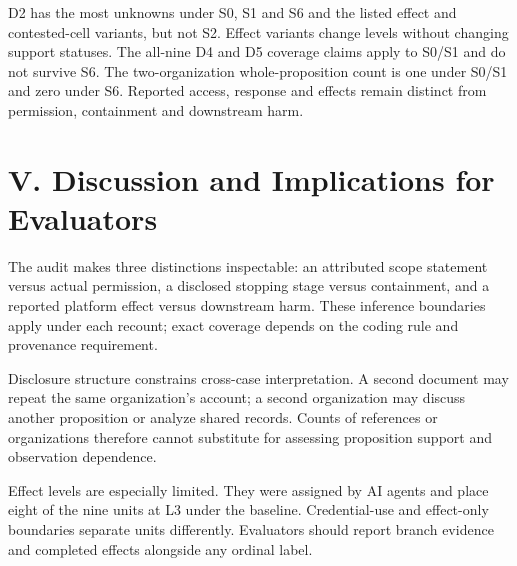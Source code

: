 \documentclass[conference]{IEEEtran}
\begin{document}
D2 has the most unknowns under S0, S1 and S6 and the listed effect and contested-cell variants, but not S2. Effect variants change levels without changing support statuses. The all-nine D4 and D5 coverage claims apply to S0/S1 and do not survive S6. The two-organization whole-proposition count is one under S0/S1 and zero under S6. Reported access, response and effects remain distinct from permission, containment and downstream harm.

\section{V. Discussion and Implications for Evaluators}

The audit makes three distinctions inspectable: an attributed scope statement versus actual permission, a disclosed stopping stage versus containment, and a reported platform effect versus downstream harm. These inference boundaries apply under each recount; exact coverage depends on the coding rule and provenance requirement.

Disclosure structure constrains cross-case interpretation. A second document may repeat the same organization's account; a second organization may discuss another proposition or analyze shared records. Counts of references or organizations therefore cannot substitute for assessing proposition support and observation dependence.

Effect levels are especially limited. They were assigned by AI agents and place eight of the nine units at L3 under the baseline. Credential-use and effect-only boundaries separate units differently. Evaluators should report branch evidence and completed effects alongside any ordinal label.
\end{document}
